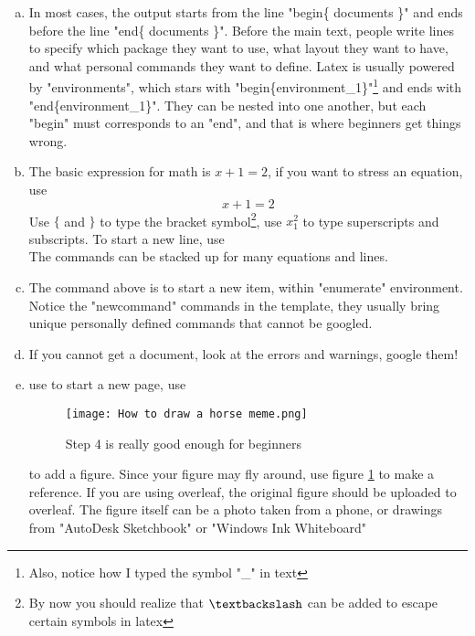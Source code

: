 \documentclass[a4paper,11pt,american]{article}
\begin{document}
\begin{enumerate}[(a)]
    \item 
    In most cases, the output starts from the line "begin\{ documents \}" and ends before the line "end\{ documents \}". Before the main text, people write lines to specify which package they want to use, what layout they want to have, and what personal commands they want to define.
    Latex is usually powered by "environments", which stars with "begin\{environment\_1\}"\footnote{Also, notice how I typed the symbol "\_" in text} and ends with "end\{environment\_1\}". They can be nested into one another, but each "begin" must corresponds to an "end", and that is where beginners get things wrong.

    \item 
    The basic expression for math is $x+1=2$, if you want to stress an equation, use
    \begin{equation}
        x+1 = 2
    \end{equation}
    Use $\{$ and $\}$ to type the bracket symbol\footnote{By now you should realize that $\textbackslash$ can be added to escape certain symbols in latex}, use $x^2_1$ to type superscripts and subscripts.
    To start a new line, use \\
    The commands can be stacked up for many equations and lines.

    \item 
    The command above is to start a new item, within "enumerate" environment. Notice the "newcommand" commands in the template, they usually bring unique personally defined commands that cannot be googled.

    \item 
    If you cannot get a document, look at the errors and warnings, google them!

    \item 
    use \newpage to start a new page, use 
    \begin{figure}
        \centering
        \texttt{[image: How to draw a horse meme.png]}%
        \caption{Step 4 is really good enough for beginners}
        \label{fig:enter-label}%
    \end{figure}
    to add a figure. Since your figure may fly around, use figure \ref{fig:enter-label} to make a reference. If you are using overleaf, the original figure should be uploaded to overleaf. The figure itself can be a photo taken from a phone, or drawings from "AutoDesk Sketchbook" or "Windows Ink Whiteboard"
    
\end{enumerate}
\end{document}
